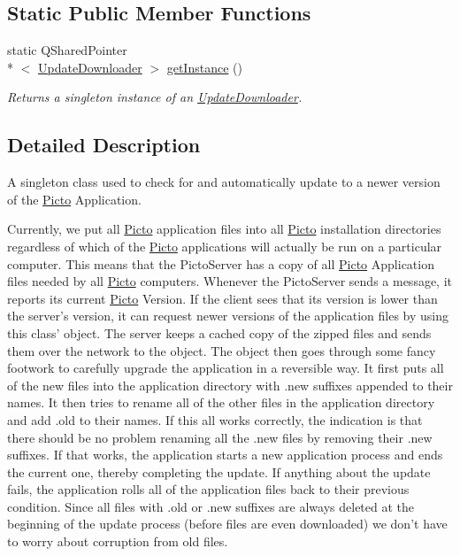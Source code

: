 \subsection*{Static Public Member Functions}
\begin{DoxyCompactItemize}
\item 
\hypertarget{class_update_downloader_aba23de83959a7e9aea32fd2d5bb7b72e}{static Q\-Shared\-Pointer\\*
$<$ \hyperlink{class_update_downloader}{Update\-Downloader} $>$ \hyperlink{class_update_downloader_aba23de83959a7e9aea32fd2d5bb7b72e}{get\-Instance} ()}\label{class_update_downloader_aba23de83959a7e9aea32fd2d5bb7b72e}

\begin{DoxyCompactList}\small\item\em Returns a singleton instance of an \hyperlink{class_update_downloader}{Update\-Downloader}. \end{DoxyCompactList}\end{DoxyCompactItemize}


\subsection{Detailed Description}
A singleton class used to check for and automatically update to a newer version of the \hyperlink{namespace_picto}{Picto} Application. 

Currently, we put all \hyperlink{namespace_picto}{Picto} application files into all \hyperlink{namespace_picto}{Picto} installation directories regardless of which of the \hyperlink{namespace_picto}{Picto} applications will actually be run on a particular computer. This means that the Picto\-Server has a copy of all \hyperlink{namespace_picto}{Picto} Application files needed by all \hyperlink{namespace_picto}{Picto} computers. Whenever the Picto\-Server sends a message, it reports its current \hyperlink{namespace_picto}{Picto} Version. If the client sees that its version is lower than the server's version, it can request newer versions of the application files by using this class' object. The server keeps a cached copy of the zipped files and sends them over the network to the object. The object then goes through some fancy footwork to carefully upgrade the application in a reversible way. It first puts all of the new files into the application directory with .new suffixes appended to their names. It then tries to rename all of the other files in the application directory and add .old to their names. If this all works correctly, the indication is that there should be no problem renaming all the .new files by removing their .new suffixes. If that works, the application starts a new application process and ends the current one, thereby completing the update. If anything about the update fails, the application rolls all of the application files back to their previous condition. Since all files with .old or .new suffixes are always deleted at the beginning of the update process (before files are even downloaded) we don't have to worry about corruption from old files.

